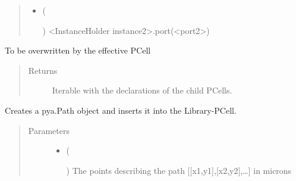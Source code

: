 \documentclass[a4paper,10pt,english]{sphinxmanual}
\begin{document}
\begin{fulllineitems}
\begin{fulllineitems}
\begin{quote}
\begin{description}
\begin{itemize}
\item {} 
 (%
\begin{footnote}[45]\sphinxAtStartFootnote
{}
%
\end{footnote}) \textendash{} \textless{}InstanceHolder instance2\textgreater{}.port(\textless{}port2\textgreater{})

\end{itemize}

\end{description}\end{quote}

\end{fulllineitems}


\begin{fulllineitems}
\label{\detokenize{photonics:kppc.photonics.PhotDevice.create_param_inst}}
To be overwritten by the effective PCell
\begin{quote}\begin{description}
\item[{Returns}] \leavevmode
Iterable with the declarations of the child PCells.

\end{description}\end{quote}

\end{fulllineitems}


\begin{fulllineitems}
\label{\detokenize{photonics:kppc.photonics.PhotDevice.create_path}}
Creates a pya.Path object and inserts it into the Library-PCell.
\begin{quote}\begin{description}
\item[{Parameters}] \leavevmode\begin{itemize}
\item {} 
 (%
\begin{footnote}[46]\sphinxAtStartFootnote
{}
%
\end{footnote}) \textendash{} The points describing the path {[}{[}x1,y1{]},{[}x2,y2{]},…{]} in microns


\end{itemize}
\end{description}
\end{quote}
\end{fulllineitems}
\end{fulllineitems}
\end{document}
